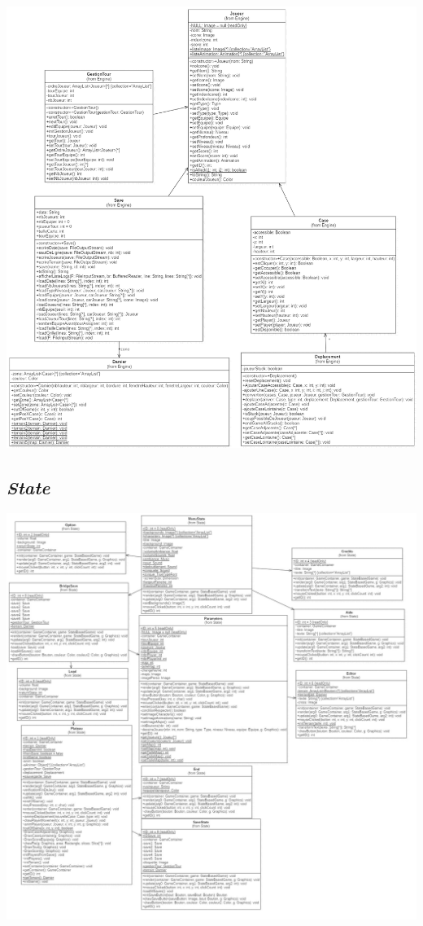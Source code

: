 \documentclass[11pt,a4paper]{article}
\begin{document}
\begin{center}
\includegraphics[width=1\textwidth]{UML/engine.png}
\end{center}

\newpage
\subsection{\textit{State}}
\vspace{40px}

\begin{center}
\includegraphics[width=1\textwidth]{UML/state.jpg}
\end{center}
\end{document}

